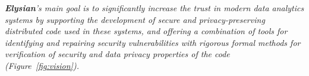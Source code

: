 \documentclass[a4paper,11pt]{article}
\newcommand{\project}[1]{\textbf{#1}\xspace}
\newcommand{\SECURITY}{\project{Elysian}}
\newcommand{\TheProject}{\SECURITY}
\begin{document}

\begin{mdframed}[backgroundcolor=blue!5]
\emph{\TheProject's main goal is to significantly increase the trust in modern data analytics systems by 
supporting the development of secure and privacy-preserving distributed code used in these systems, and 
offering a combination of %
tools for identifying and repairing security vulnerabilities with rigorous formal methods for verification of security and data privacy properties of the code (Figure~\ref{fig:vision}).}
\end{mdframed}
\end{document}

